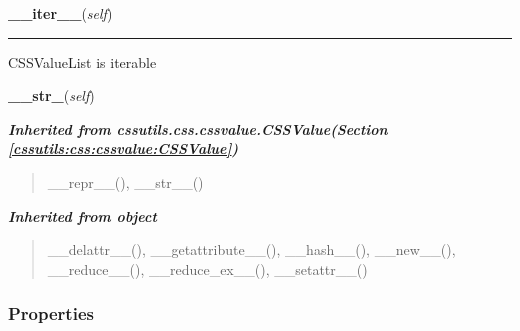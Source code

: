     \vspace{0.5ex}

\hspace{.8\funcindent}\begin{boxedminipage}{\funcwidth}

    \raggedright \textbf{\_\_iter\_\_}(\textit{self})

    \vspace{-1.5ex}

    \rule{\textwidth}{0.5\fboxrule}
\setlength{\parskip}{2ex}

CSSValueList is iterable
\setlength{\parskip}{1ex}
    \end{boxedminipage}

    \label{cssutils:css:cssvalue:CSSValueList:__str_}

    \vspace{0.5ex}

\hspace{.8\funcindent}\begin{boxedminipage}{\funcwidth}

    \raggedright \textbf{\_\_str\_}(\textit{self})

\setlength{\parskip}{2ex}
\setlength{\parskip}{1ex}
    \end{boxedminipage}


\large{\textbf{\textit{Inherited from cssutils.css.cssvalue.CSSValue\textit{(Section \ref{cssutils:css:cssvalue:CSSValue})}}}}

\begin{quote}
\_\_repr\_\_(), \_\_str\_\_()
\end{quote}

\large{\textbf{\textit{Inherited from object}}}

\begin{quote}
\_\_delattr\_\_(), \_\_getattribute\_\_(), \_\_hash\_\_(), \_\_new\_\_(), \_\_reduce\_\_(), \_\_reduce\_ex\_\_(), \_\_setattr\_\_()
\end{quote}


  \subsubsection{Properties}

